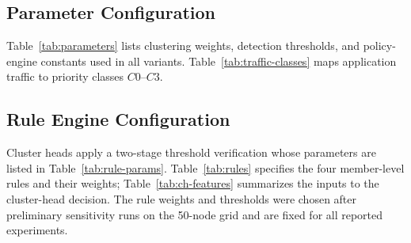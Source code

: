\subsection{Parameter Configuration}
Table~\ref{tab:parameters} lists clustering weights, detection thresholds, and policy-engine constants used in all variants.
Table~\ref{tab:traffic-classes} maps application traffic to priority classes $C0$--$C3$.



\subsection{Rule Engine Configuration}
Cluster heads apply a two-stage threshold verification whose parameters are listed in Table~\ref{tab:rule-params}.
Table~\ref{tab:rules} specifies the four member-level rules and their weights; Table~\ref{tab:ch-features} summarizes the inputs to the cluster-head decision.
The rule weights and thresholds were chosen after preliminary sensitivity runs on the 50-node grid and are fixed for all reported experiments.



